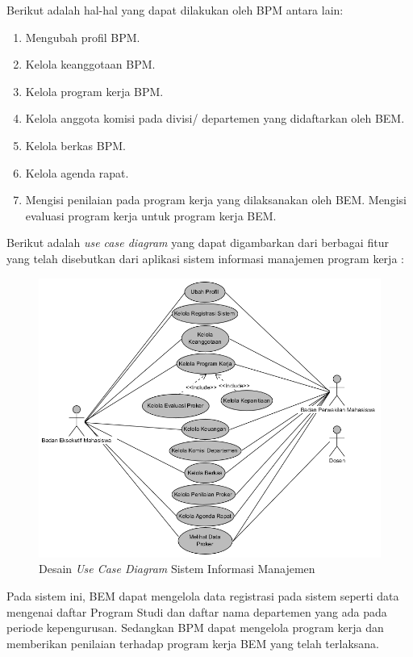 Berikut adalah hal-hal yang dapat dilakukan oleh BPM antara lain:

\begin{enumerate}
	\item Mengubah profil BPM.
	\item Kelola keanggotaan BPM.
	\item Kelola program kerja BPM.
	\item Kelola anggota komisi pada divisi/ departemen yang didaftarkan oleh BEM.
	\item Kelola berkas BPM.
	\item Kelola agenda rapat.
	\item Mengisi penilaian pada program kerja yang dilaksanakan oleh BEM.
	Mengisi evaluasi program kerja untuk program kerja BEM.
\end{enumerate}

Berikut adalah \emph{use case diagram} yang dapat digambarkan dari berbagai fitur yang telah disebutkan dari aplikasi sistem informasi manajemen program kerja :

\begin{figure}[H]
	\centering
	\includegraphics[width=1.0\textwidth]{gambar/after_sps/usecasev2}
	\caption{Desain \emph{Use Case Diagram} Sistem Informasi Manajemen}
	\label{usecase_diagram}
\end{figure}

Pada sistem ini, BEM dapat mengelola data registrasi pada sistem seperti data mengenai daftar Program Studi dan daftar nama departemen yang ada pada periode kepengurusan. Sedangkan BPM dapat mengelola program kerja dan memberikan penilaian terhadap program kerja BEM yang telah terlaksana.

